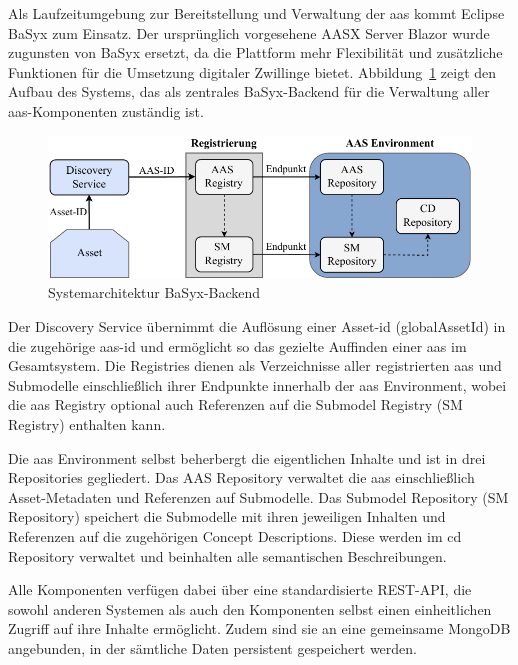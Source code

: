 Als Laufzeitumgebung zur Bereitstellung und Verwaltung der \acs{aas} kommt Eclipse BaSyx zum Einsatz.
Der ursprünglich vorgesehene AASX Server Blazor wurde zugunsten von BaSyx ersetzt, da die Plattform mehr Flexibilität und zusätzliche Funktionen für die Umsetzung digitaler Zwillinge bietet.
Abbildung~\ref{fig:BaSyxArchitektur} zeigt den Aufbau des Systems, das als zentrales BaSyx-Backend für die Verwaltung aller \acs{aas}-Komponenten zuständig ist.

\newpage
\begin{figure}[htbp]
    \centering
        \includegraphics[width=1\textwidth]{Bilder/Ergebnisse/Systemarchitektur/BaSyx.pdf}
    \caption{Systemarchitektur BaSyx-Backend}
    \label{fig:BaSyxArchitektur}
\end{figure}

Der Discovery Service übernimmt die Auflösung einer Asset-\acs{id} (globalAssetId) in die zugehörige \acs{aas}-\acs{id} und ermöglicht so das gezielte Auffinden einer \acs{aas} im Gesamtsystem. 
Die Registries dienen als Verzeichnisse aller registrierten \acs{aas} und Submodelle einschließlich ihrer Endpunkte innerhalb der \acs{aas} Environment, wobei die \acs{aas} Registry optional auch Referenzen auf die Submodel Registry (SM Registry) enthalten kann. 

Die \acs{aas} Environment selbst beherbergt die eigentlichen Inhalte und ist in drei Repositories gegliedert. 
Das AAS Repository verwaltet die \acs{aas} einschließlich Asset-Metadaten und Referenzen auf Submodelle. 
Das Submodel Repository (SM Repository) speichert die Submodelle mit ihren jeweiligen Inhalten und Referenzen auf die zugehörigen Concept Descriptions. 
Diese werden im \acs{cd} Repository verwaltet und beinhalten alle semantischen Beschreibungen.

Alle Komponenten verfügen dabei über eine standardisierte REST-API, die sowohl anderen Systemen als auch den Komponenten selbst einen einheitlichen Zugriff auf ihre Inhalte ermöglicht. 
Zudem sind sie an eine gemeinsame MongoDB angebunden, in der sämtliche Daten persistent gespeichert werden.

